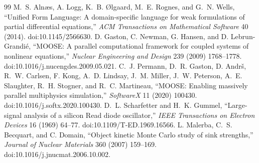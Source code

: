 \documentclass[11pt]{article}
\begin{document}
\begin{thebibliography}{99}
 M.~S. Aln{\ae}s, A. Logg, K.~B. {\O}lgaard, M.~E. Rognes, and G.~N. Wells, ``Unified Form Language: A domain-specific language for weak formulations of partial differential equations,'' \emph{ACM Transactions on Mathematical Software} 40 (2014). doi:10.1145/2566630.
 D. Gaston, C. Newman, G. Hansen, and D. Lebrun-Grandi\'e, ``MOOSE: A parallel computational framework for coupled systems of nonlinear equations,'' \emph{Nuclear Engineering and Design} 239 (2009) 1768--1778. doi:10.1016/j.nucengdes.2009.05.021.
 C.~J. Permann, D.~R. Gaston, D. Andr\v{s}, R.~W. Carlsen, F. Kong, A.~D. Lindsay, J.~M. Miller, J.~W. Peterson, A.~E. Slaughter, R.~H. Stogner, and R.~C. Martineau, ``MOOSE: Enabling massively parallel multiphysics simulation,'' \emph{SoftwareX} 11 (2020) 100430. doi:10.1016/j.softx.2020.100430.
 D.~L. Scharfetter and H.~K. Gummel, ``Large-signal analysis of a silicon Read diode oscillator,'' \emph{IEEE Transactions on Electron Devices} 16 (1969) 64--77. doi:10.1109/T-ED.1969.16566.
 L. Malerba, C.~S. Becquart, and C. Domain, ``Object kinetic Monte Carlo study of sink strengths,'' \emph{Journal of Nuclear Materials} 360 (2007) 159--169. doi:10.1016/j.jnucmat.2006.10.002.
\end{thebibliography}
\end{document}
